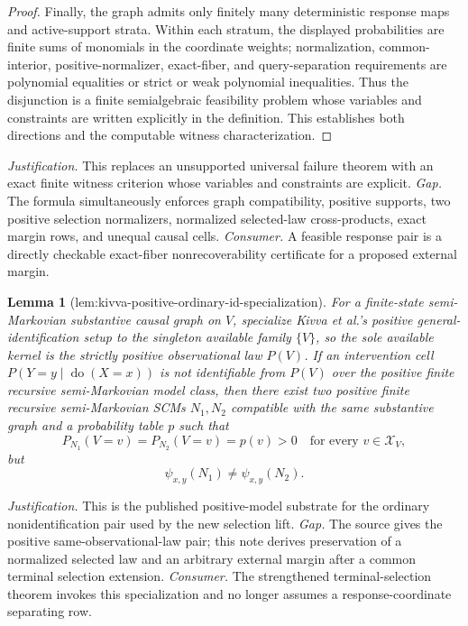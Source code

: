 \documentclass{article}
\newtheorem{lemma}{Lemma}
\begin{document}
\begin{proof}
Finally, the graph admits only finitely many deterministic response maps and active-support strata.  Within each stratum, the displayed probabilities are finite sums of monomials in the coordinate weights; normalization, common-interior, positive-normalizer, exact-fiber, and query-separation requirements are polynomial equalities or strict or weak polynomial inequalities.  Thus the disjunction is a finite semialgebraic feasibility problem whose variables and constraints are written explicitly in the definition.  This establishes both directions and the computable witness characterization.
\end{proof}
\par\smallskip\noindent \textit{Justification.} This replaces an unsupported universal failure theorem with an exact finite witness criterion whose variables and constraints are explicit. \textit{Gap.} The formula simultaneously enforces graph compatibility, positive supports, two positive selection normalizers, normalized selected-law cross-products, exact margin rows, and unequal causal cells. \textit{Consumer.} A feasible response pair is a directly checkable exact-fiber nonrecoverability certificate for a proposed external margin.

\begin{lemma}[lem:kivva-positive-ordinary-id-specialization]\label{lem:kivva-positive-ordinary-id-specialization}
For a finite-state semi-Markovian substantive causal graph on \(V\), specialize Kivva et al.'s positive general-identification setup to the singleton available family \(\{V\}\), so the sole available kernel is the strictly positive observational law \(P(V)\). If an intervention cell \(P(Y=y\mid\operatorname{do}(X=x))\) is not identifiable from \(P(V)\) over the positive finite recursive semi-Markovian model class, then there exist two positive finite recursive semi-Markovian SCMs \(N_1,N_2\) compatible with the same substantive graph and a probability table \(p\) such that
\[
 P_{N_1}(V=v)=P_{N_2}(V=v)=p(v)>0
 \quad\text{for every }v\in\mathcal X_V,
\]
but
\[
 \psi_{x,y}(N_1)\ne\psi_{x,y}(N_2).
\]
\end{lemma}
\par\smallskip\noindent \textit{Justification.} This is the published positive-model substrate for the ordinary nonidentification pair used by the new selection lift. \textit{Gap.} The source gives the positive same-observational-law pair; this note derives preservation of a normalized selected law and an arbitrary external margin after a common terminal selection extension. \textit{Consumer.} The strengthened terminal-selection theorem invokes this specialization and no longer assumes a response-coordinate separating row.
\end{document}
